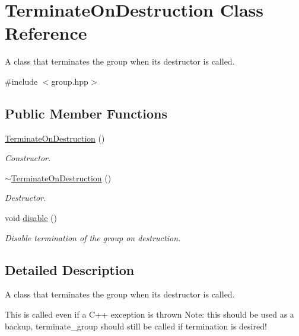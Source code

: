 \hypertarget{class_terminate_on_destruction}{}\section{Terminate\+On\+Destruction Class Reference}
\label{class_terminate_on_destruction}


A class that terminates the group when its destructor is called.  




{\ttfamily \#include $<$group.\+hpp$>$}

\subsection*{Public Member Functions}
\begin{DoxyCompactItemize}
\item 
\mbox{\hyperlink{class_terminate_on_destruction_ac1b230c0858db2e39b83188eae7c5a8e}{Terminate\+On\+Destruction}} ()
\begin{DoxyCompactList}\small\item\em Constructor. \end{DoxyCompactList}\item 
\mbox{\hyperlink{class_terminate_on_destruction_a1e2e372004731b788bb9df84d618181f}{$\sim$\+Terminate\+On\+Destruction}} ()
\begin{DoxyCompactList}\small\item\em Destructor. \end{DoxyCompactList}\item 
void \mbox{\hyperlink{class_terminate_on_destruction_a3ee7e31e435328d6ff97edd5627f7c27}{disable}} ()
\begin{DoxyCompactList}\small\item\em Disable termination of the group on destruction. \end{DoxyCompactList}\end{DoxyCompactItemize}


\subsection{Detailed Description}
A class that terminates the group when its destructor is called. 

This is called even if a C++ exception is thrown Note\+: this should be used as a backup, terminate\+\_\+group should still be called if termination is desired! 

